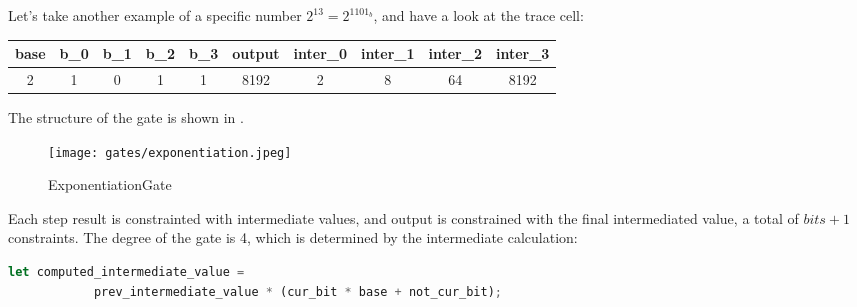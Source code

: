 Let's take another example of a specific number $2^{13} = 2^{1101_b}$, and have a look at the trace cell:
\begin{center}
    \begin{tabular}{ |c|c|c|c|c|c|c|c|c|c| }
        \hline
        base & b\_0 & b\_1 & b\_2 & b\_3 & output & inter\_0 & inter\_1 & inter\_2 & inter\_3 \\
        \hline
        2 & 1 & 0 & 1 & 1 & 8192 & 2 & 8 & 64 & 8192 \\
        \hline
    \end{tabular}
\end{center}

The structure of the gate is shown in .
\begin{figure}[!ht]
    \centering
    \texttt{[image: gates/exponentiation.jpeg]}
    \caption{ExponentiationGate}
    \label{fig:exponetiation-gate}
\end{figure}

Each step result is constrainted with intermediate values, and output is constrained with the final intermediated value, a total of $bits + 1$ constraints.
The degree of the gate is 4, which is determined by the intermediate calculation:
\begin{lstlisting}[language=rust]
let computed_intermediate_value =
            prev_intermediate_value * (cur_bit * base + not_cur_bit);
\end{lstlisting}
